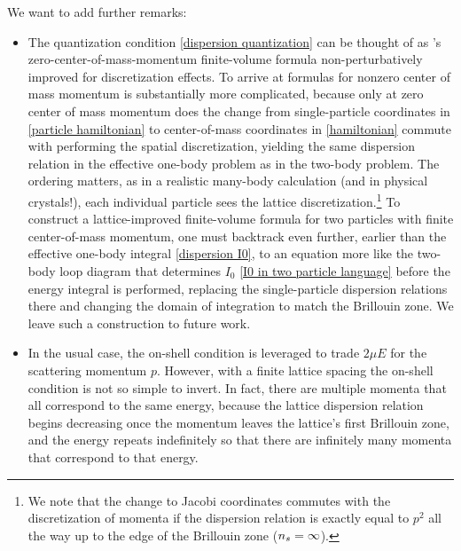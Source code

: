 We want to add further remarks:
\begin{itemize}
\item The quantization condition \eqref{dispersion quantization} can be thought of as \Luscher's zero-center-of-mass-momentum finite-volume formula non-perturbatively improved for discretization effects.
To arrive at formulas for nonzero center of mass momentum is substantially more complicated, because only at zero center of mass momentum does the change from single-particle coordinates in \eqref{particle hamiltonian} to center-of-mass coordinates in \eqref{hamiltonian} commute with performing the spatial discretization, yielding the same dispersion relation in the effective one-body problem as in the two-body problem.
The ordering matters, as in a realistic many-body calculation (and in physical crystals!), each individual particle sees the lattice discretization.\footnote{
We note that the change to Jacobi coordinates commutes with the discretization of momenta if the dispersion relation is exactly equal to $p^2$ all the way up to the edge of the Brillouin zone (${n_s}=\infty$).}
To construct a lattice-improved finite-volume formula for two particles with finite center-of-mass momentum, one must backtrack even further, earlier than the effective one-body integral \eqref{dispersion I0}, to an equation more like the two-body loop diagram that determines $I_0$ \eqref{I0 in two particle language} before the energy integral is performed, replacing the single-particle dispersion relations there and changing the domain of integration to match the Brillouin zone.
We leave such a construction to future work.

\item In the usual case, the on-shell condition is leveraged to trade $2\mu E$ for the scattering momentum $p$.
However, with a finite lattice spacing the on-shell condition is not so simple to invert.
In fact, there are multiple momenta that all correspond to the same energy, because the lattice dispersion relation begins decreasing once the momentum leaves the lattice's first Brillouin zone, and the energy repeats indefinitely so that there are infinitely many momenta that correspond to that energy.



\end{itemize}
